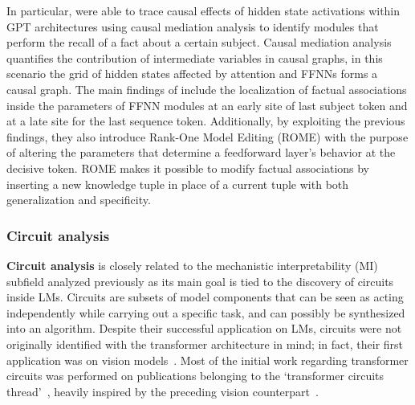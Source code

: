 In particular, \citet{meng2022} were able to trace causal effects of hidden state activations within GPT architectures using causal mediation analysis to identify modules that perform the recall of a fact about a certain subject.
Causal mediation analysis quantifies the contribution of intermediate variables in causal graphs, in this scenario the grid of hidden states affected by attention and FFNNs forms a causal graph.
The main findings of \citet{meng2022} include the localization of factual associations inside the parameters of FFNN modules at an early site of last subject token and at a late site for the last sequence token.
Additionally, by exploiting the previous findings, they also introduce Rank-One Model Editing (ROME) with the purpose of altering the parameters that determine a feedforward layer's behavior at the decisive token.
ROME makes it possible to modify factual associations by inserting a new knowledge tuple in place of a current tuple with both generalization and specificity.

\subsubsection{Circuit analysis}

\textbf{Circuit analysis} is closely related to the mechanistic interpretability (MI) subfield analyzed previously as its main goal is tied to the discovery of circuits inside LMs.
Circuits are subsets of model components that can be seen as acting independently while carrying out a specific task, and can possibly be synthesized into an algorithm.
Despite their successful application on LMs, circuits were not originally identified with the transformer architecture in mind; in fact, their first application was on vision models~\cite{cammarata2020}.
Most of the initial work regarding transformer circuits was performed on publications belonging to the `transformer circuits thread'~\cite{elhage2021,olsson2022,elhage2022,bricken2023,elhage2023}, heavily inspired by the preceding vision counterpart~\cite{cammarata2020}.

